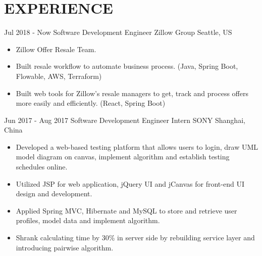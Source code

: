 
\section{EXPERIENCE}

{\customcventry
{Jul 2018 - Now}
{Software Development Engineer}
{Zillow Group}
{Seattle, US}
{}
{
    \begin{itemize}
        \item Zillow Offer Resale Team.
        \item Built resale workflow to automate business process. (Java, Spring Boot, Flowable, AWS, Terraform) 
        \item Built web tools for Zillow's resale managers to get, track and process offers more easily and efficiently. (React, Spring Boot)
    \end{itemize}
}   
}

{\customcventry
{Jun 2017 - Aug 2017}
{Software Development Engineer Intern}
{SONY}
{Shanghai, China}
{}
{
    \begin{itemize}
        \item Developed a web-based testing platform that allows users to login, draw UML model diagram on canvas, implement algorithm and establish testing schedules online.
        \item Utilized JSP for web application, jQuery UI and jCanvas for front-end UI design and development.
        \item Applied Spring MVC, Hibernate and MySQL to store and retrieve user profiles, model data and implement algorithm.
        \item Shrank calculating time by 30\% in server side by rebuilding service layer and introducing pairwise algorithm.
    \end{itemize}
}   
}